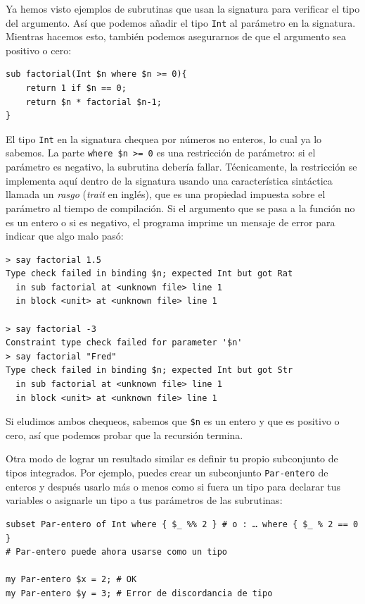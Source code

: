 Ya hemos visto ejemplos de subrutinas que usan la signatura para 
verificar el tipo del argumento. Así que podemos añadir el tipo
{\tt Int} al parámetro en la signatura. Mientras hacemos esto,
también podemos asegurarnos de que el argumento sea positivo o cero:

\begin{verbatim}
sub factorial(Int $n where $n >= 0){
    return 1 if $n == 0;
    return $n * factorial $n-1;
}
\end{verbatim}
%
El tipo {\tt Int} en la signatura chequea por números no enteros,
lo cual ya lo sabemos. La parte {\tt where \$n >= 0} es una restricción
de parámetro: si el parámetro es negativo, la subrutina debería
fallar. Técnicamente, la restricción se implementa aquí dentro de la
signatura usando una característica sintáctica llamada un \emph{rasgo}
(\emph{trait} en inglés), que es una propiedad impuesta sobre el parámetro
al tiempo de compilación. Si el argumento que se pasa a la función no
es un entero o si es negativo, el programa imprime un 
mensaje de error para indicar que algo malo pasó:

\begin{verbatim}
> say factorial 1.5
Type check failed in binding $n; expected Int but got Rat
  in sub factorial at <unknown file> line 1
  in block <unit> at <unknown file> line 1

> say factorial -3
Constraint type check failed for parameter '$n'
> say factorial "Fred"
Type check failed in binding $n; expected Int but got Str
  in sub factorial at <unknown file> line 1
  in block <unit> at <unknown file> line 1
\end{verbatim}
% 
Si eludimos ambos chequeos, sabemos que \verb|$n|
es un entero y que es positivo o cero, así que podemos 
probar que la recursión termina.


Otra modo de lograr un resultado similar es definir tu propio
subconjunto de tipos integrados. Por ejemplo, puedes crear un
subconjunto {\tt Par-entero} de enteros y después usarlo más o 
menos como si fuera un tipo para declarar tus variables o asignarle
un tipo a tus parámetros de las subrutinas:

\begin{verbatim}
subset Par-entero of Int where { $_ %% 2 } # o : … where { $_ % 2 == 0 }
# Par-entero puede ahora usarse como un tipo

my Par-entero $x = 2; # OK
my Par-entero $y = 3; # Error de discordancia de tipo
\end{verbatim}

